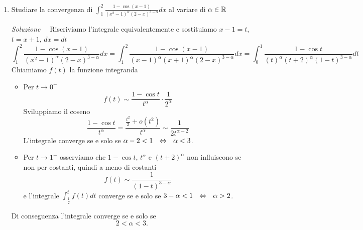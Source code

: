 \documentclass{article}
\begin{document}
\begin{enumerate}[label=\textbf{Esercizio 11.\arabic*.},itemindent=*]
\item Studiare la convergenza di $\int_1^2\frac{1-\cos (x-1)}{(x^2-1)^\alpha(2-x)^{3-\alpha}}dx$ al variare di $\alpha \in \mathbb{R}$
\item[\textit{\large Soluzione~}]~Riscriviamo l'integrale equivalentemente e sostituiamo $x-1=t$, $t=x+1$, $dx=dt$
\[\int_1^2\frac{1-\cos (x-1)}{(x^2-1)^\alpha(2-x)^{3-\alpha}}dx=\int_1^2\frac{1-\cos (x-1)}{(x-1)^\alpha(x+1)^\alpha(2-x)^{3-\alpha}}dx=\int_0^1\frac{1-\cos t}{(t)^\alpha(t+2)^\alpha(1-t)^{3-\alpha}}dt\]
Chiamiamo $f(t)$ la funzione integranda
\begin{itemize}
    \item Per $t\to0^+$
    \[f(t)\sim\frac{1-\cos t}{t^\alpha}\cdot\frac{1}{2^\alpha}\]
    Sviluppiamo il coseno
    \[\frac{1-\cos t}{t^\alpha}=\frac{\frac{t^2}{2}+o(t^2)}{t^{\alpha}}\sim \frac{1}{2t^{\alpha - 2}}\]
    L'integrale converge se e solo se $\alpha-2<1~~\Leftrightarrow~~\alpha<3$.
    \item Per $t\to1^-$ osserviamo che $1-\cos t$, $t^\alpha$ e $(t+2)^\alpha$ non influiscono se non per costanti, quindi a meno di costanti
    \[f(t)\sim \frac{1}{(1-t)^{3-\alpha}}\]
    e l'integrale $\int_{\frac{1}{2}}^tf(t)dt$ converge se e solo se $3-\alpha <1~~\Leftrightarrow~~\alpha>2$.
\end{itemize}
Di conseguenza l'integrale converge se e solo se 
\[2<\alpha<3.\]


\end{enumerate}
\end{document}
